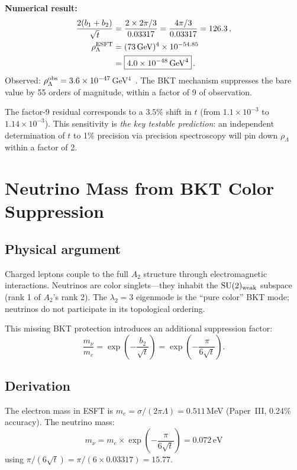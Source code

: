 \documentclass[twocolumn,preprintnumbers,amsmath,amssymb,prd]{revtex4-2}
\begin{document}
\textbf{Numerical result:}
\begin{align}
\frac{2(b_1+b_2)}{\sqrt{t}} &= \frac{2\times 2\pi/3}{0.03317} = \frac{4\pi/3}{0.03317} = 126.3\,, \notag\\
\rho_\Lambda^{\rm ESFT} &= (73\,\text{GeV})^4 \times 10^{-54.85} \notag\\
&= \boxed{4.0\times10^{-48}\,\text{GeV}^4}\,.
\label{eq:rho_lambda}
\end{align}
Observed: $\rho_\Lambda^{\rm obs} = 3.6\times10^{-47}\,$GeV$^4$~\cite{Planck2020}.
The BKT mechanism suppresses the bare value by 55 orders of magnitude, within a factor of 9 of observation.

The factor-9 residual corresponds to a $3.5\%$ shift in $t$ (from $1.1\times10^{-3}$ to $1.14\times10^{-3}$).
This sensitivity is \emph{the key testable prediction}: an independent determination of $t$ to 1\% precision via precision spectroscopy will pin down $\rho_\Lambda$ within a factor of 2.

\section{Neutrino Mass from BKT Color Suppression}
\label{sec:neutrino}

\subsection{Physical argument}

Charged leptons couple to the full $A_2$ structure through electromagnetic interactions.
Neutrinos are color singlets---they inhabit the $\mathrm{SU}(2)_{\rm weak}$ subspace (rank 1 of $A_2$'s rank 2).
The $\lambda_2 = 3$ eigenmode is the ``pure color'' BKT mode; neutrinos do not participate in its topological ordering.

This missing BKT protection introduces an additional suppression factor:
\begin{equation}
\frac{m_\nu}{m_e} = \exp\!\left(-\frac{b_2}{\sqrt{t}}\right) = \exp\!\left(-\frac{\pi}{6\sqrt{t}}\right).
\end{equation}

\subsection{Derivation}

The electron mass in ESFT is $m_e = \sigma/(2\pi\Lambda) = 0.511\,$MeV (Paper~III, 0.24\% accuracy).
The neutrino mass:
\begin{equation}
\boxed{m_\nu = m_e \times \exp\!\left(-\frac{\pi}{6\sqrt{t}}\right) = 0.072\,\text{eV}}
\label{eq:m_nu}
\end{equation}
using $\pi/(6\sqrt{t}) = \pi/(6\times0.03317) = 15.77$.
\end{document}
